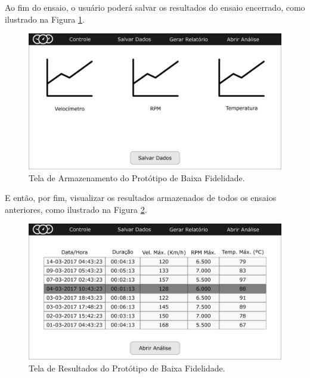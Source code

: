 \begin{anexosenv}
Ao fim do ensaio, o usuário poderá salvar os resultados do ensaio encerrado, como ilustrado na Figura \ref{fig:telasalvardados}.

\begin{figure}[h!]
	\centering
	\includegraphics[keepaspectratio=true,scale= 0.23]{figuras/telasalvardados.png}
	\caption{Tela de Armazenamento do Protótipo de Baixa Fidelidade.}
	\label{fig:telasalvardados}
\end{figure}

E então, por fim, visualizar os resultados armazenados de todos os ensaios anteriores, como ilustrado na Figura \ref{fig:telaresultados}.

\begin{figure}[h!]
	\centering
	\includegraphics[keepaspectratio=true,scale= 0.23]{figuras/telaresultados.png}
	\caption{Tela de Resultados do Protótipo de Baixa Fidelidade.}
	\label{fig:telaresultados}
\end{figure}

\end{anexosenv}



